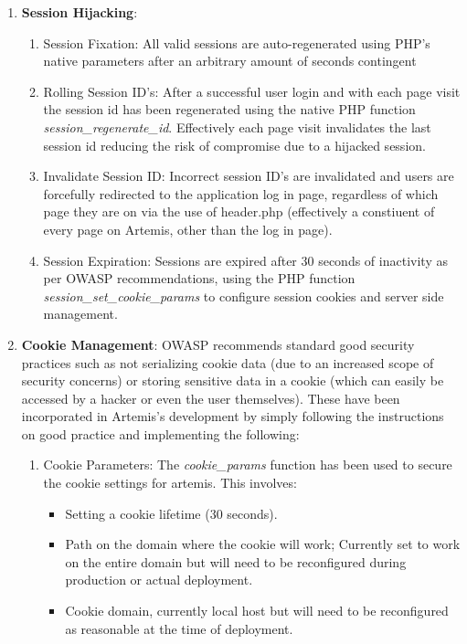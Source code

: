     \begin{enumerate}
        \item \textbf{Session Hijacking}: 
        \begin{enumerate}
            \item Session Fixation\cite{OWASPa}: All valid sessions are auto-regenerated using PHP's native parameters after an arbitrary amount of seconds contingent
            \item Rolling Session ID's: After a successful user login and with each page visit the session id has been regenerated using the native PHP function \textit{session\_regenerate\_id}. Effectively each page visit invalidates the last session id reducing the risk of compromise due to a hijacked session.
            \item Invalidate Session ID: Incorrect session ID's are invalidated and users are forcefully redirected to the application log in page, regardless of which page they are on via the use of header.php (effectively a constiuent of every page on Artemis, other than the log in page).
            \item Session Expiration: Sessions are expired after 30 seconds of inactivity as per OWASP recommendations, using the PHP function \textit{session\_set\_cookie\_params} to configure session cookies and server side management.
        \end{enumerate}
        \item \textbf{Cookie Management}:
        OWASP \cite{OWASPa} recommends standard good security practices such as not serializing cookie data (due to an increased scope of security concerns) or storing sensitive data in a cookie (which can easily be accessed by a hacker or even the user themselves).  These have been incorporated in Artemis's development by simply following the instructions on good practice and implementing the following:
        \begin{enumerate}
            \item Cookie Parameters: The \textit{cookie\_params} function has been used to secure the cookie settings for artemis. This involves:
                \begin{itemize}
                    \item Setting a cookie lifetime (30 seconds).
                    \item Path on the domain where the cookie will work; Currently set to work on the entire domain but will need to be reconfigured during production or actual deployment.
                    \item Cookie domain, currently local host but will need to be reconfigured as reasonable at the time of deployment.

\end{itemize}
\end{enumerate}
\end{enumerate}

